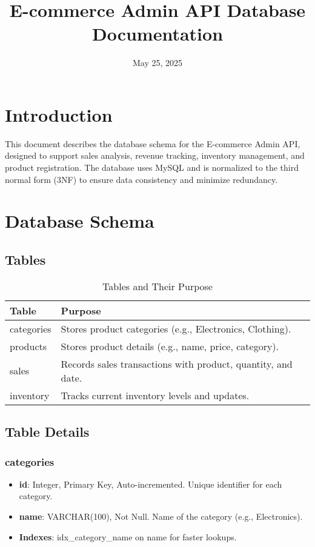 \documentclass[a4paper,12pt]{article}
\begin{document}
\title{E-commerce Admin API Database Documentation}
\author{}
\date{May 25, 2025}
\maketitle

\section{Introduction}
This document describes the database schema for the E-commerce Admin API, designed to support sales analysis, revenue tracking, inventory management, and product registration. The database uses MySQL and is normalized to the third normal form (3NF) to ensure data consistency and minimize redundancy.

\section{Database Schema}

\subsection{Tables}

\begin{table}[h]
\centering
\caption{Tables and Their Purpose}
\begin{tabular}{ll}
\toprule
\textbf{Table} & \textbf{Purpose} \\
\midrule
categories & Stores product categories (e.g., Electronics, Clothing). \\
products & Stores product details (e.g., name, price, category). \\
sales & Records sales transactions with product, quantity, and date. \\
inventory & Tracks current inventory levels and updates. \\
\bottomrule
\end{tabular}
\end{table}

\subsection{Table Details}

\subsubsection{categories}
\begin{itemize}
    \item \textbf{id}: Integer, Primary Key, Auto-incremented. Unique identifier for each category.
    \item \textbf{name}: VARCHAR(100), Not Null. Name of the category (e.g., Electronics).
    \item \textbf{Indexes}: idx\_category\_name on name for faster lookups.
\end{itemize}
\end{document}
